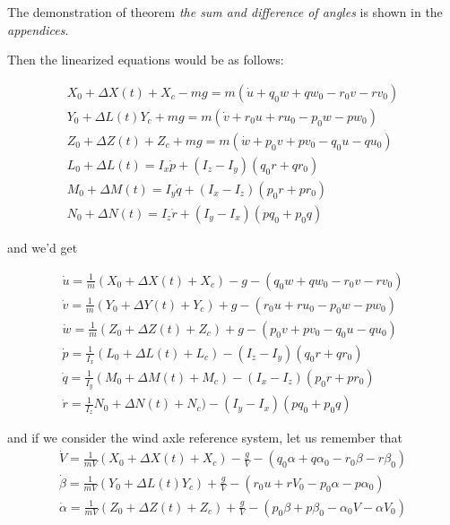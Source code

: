 The demonstration of theorem \textit{the sum and difference of angles} is shown in the \textit{appendices}.

Then the linearized equations would be as follows:


\begin{gather}
    X_0 + \Delta X(t) + X_c - mg = m(\dot u + q_0 w + q w_0 - r_0 v - r v_0) \\
    Y_0 + \Delta L(t) Y_c + mg = m (\dot v + r_0 u + r u_0 - p_0 w - p w_0) \\
    Z_0 + \Delta Z(t) + Z_c + mg = m ( \dot w + p_0 v + p v_0 - q_0 u - q u_0) \\
    L_0 + \Delta L(t) = I_x \dot p + (I_z - I_y)(q_0 r + q r_0) \\
    M_0 + \Delta M(t) = I_y \dot q + (I_x - I_z) (p_0 r + p r_0) \\
    N_0 + \Delta N(t) = I_z \dot r + (I_y - I_x)(p q_0 + p_0 q)
\end{gather}

and we'd get 

\begin{gather}
    \dot u  = \frac{1}{m}(X_0 + \Delta X(t) + X_c) - g - (q_0 w + q w_0 - r_0 v - r v_0) \\
    \dot v = \frac{1}{m}(Y_0 + \Delta Y(t) + Y_c) + g -( r_0 u + r u_0 - p_0 w - p w_0) \\
    \dot w = \frac{1}{m}(Z_0 + \Delta Z(t) + Z_c) + g -( p_0 v + p v_0 - q_0 u - q u_0) \\
    \dot p = \frac{1}{I_x}(L_0 + \Delta L(t) + L_c) - (I_z - I_y)(q_0 r + q r_0) \\
    \dot q = \frac{1}{I_y}(M_0 + \Delta M(t) + M_c) - (I_x - I_z) (p_0 r + p r_0) \\
    \dot r = \frac{1}{I_z}N_0 + \Delta N(t) + N_c) - (I_y - I_x)(p q_0 + p_0 q)
\end{gather}

and if we consider the wind axle reference system, let us remember that 
\begin{gather}
    \dot V  = \frac{1}{mV}(X_0 + \Delta X(t) + X_c) - \frac{g}{V} - (q_0 \alpha + q \alpha_0 - r_0 \beta - r \beta_0) \\
    \dot \beta = \frac{1}{mV}(Y_0 + \Delta L(t) Y_c) + \frac{g}{V} -( r_0 u + r V_0 - p_0 \alpha - p \alpha_0) \\
    \dot \alpha = \frac{1}{mV}(Z_0 + \Delta Z(t) + Z_c) + \frac{g}{V} -( p_0 \beta + p \beta_0 - \alpha_0 V - \alpha V_0) \\
\end{gather}


